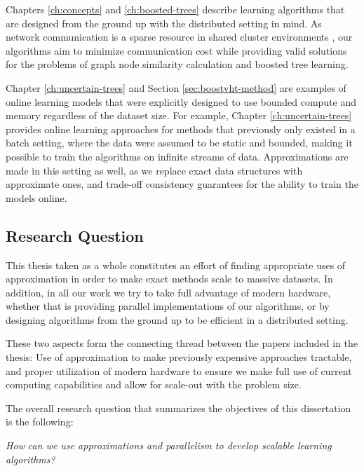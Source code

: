 Chapters \ref{ch:concepts} and \ref{ch:boosted-trees} describe learning algorithms that
are designed from the ground up with the distributed setting in mind. As network
communication is a sparse resource in shared cluster environments \cite{optimization-communication-complexity},
our algorithms aim to minimize communication cost while providing valid
solutions for the problems of graph node similarity calculation and
boosted tree learning.

Chapter \ref{ch:uncertain-trees} and Section \ref{sec:boostvht-method}
are examples of online learning models
that were explicitly designed to use bounded compute and memory regardless of the
dataset size. For example, Chapter \ref{ch:uncertain-trees} provides online learning approaches
for methods that previously only existed in a batch setting, where the data were assumed to be
static and bounded, making it possible to train the algorithms on infinite streams of
data. Approximations are made in this setting as well,
as we replace exact data structures with approximate ones, and trade-off consistency
guarantees for the ability to train the models online.


\subsection{Research Question}

This thesis taken as a whole constitutes an effort of finding appropriate
uses of approximation in order to make exact methods scale to massive datasets.
In addition, in all our work we try to take full advantage of modern hardware,
whether that is providing parallel implementations of our algorithms,
or by designing algorithms from the
ground up to be efficient in a distributed setting.

These two aspects form the connecting thread between the papers
included in the thesis: Use of approximation to make previously expensive approaches tractable, and
proper utilization of modern hardware to ensure we make full use of current
computing capabilities and allow for scale-out with the problem size.

The overall research question that summarizes the objectives of this dissertation is the following:

\begin{displayquote}
	\emph{How can we use approximations and parallelism to develop scalable learning algorithms?}
\end{displayquote}

